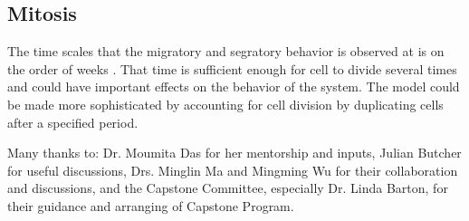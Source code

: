\documentclass[aps,prb,twocolumn,groupedaddress,nofootinbib,floatfix]{revtex4}
\begin{document}
\subsection{Mitosis}

The time scales that the migratory and segratory behavior is observed at is on the order of weeks \cite{Mingming}.
That time is sufficient enough for cell to divide several times and could have important effects on the behavior of the system.
The model could be made more sophisticated by accounting for cell division by duplicating cells after a specified period.

\begin{acknowledgments}
Many thanks to: Dr. Moumita Das for her mentorship and inputs, Julian Butcher for useful discussions, Drs. Minglin Ma and Mingming Wu for their collaboration and discussions, 
and the Capstone Committee, especially Dr. Linda Barton, for their guidance and arranging of Capstone Program.
\end{acknowledgments}

\vspace{0.6in}
%
%



\end{document}
